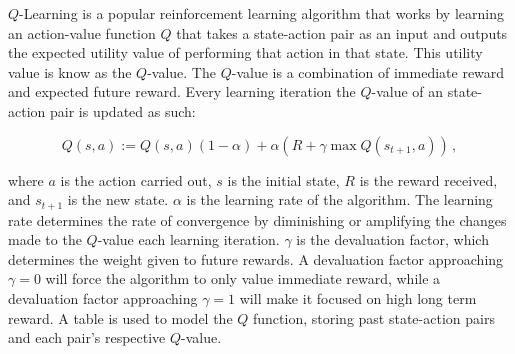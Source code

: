 $Q$-Learning \cite{watkins} is a popular reinforcement learning algorithm that works by learning an action-value function $Q$ that takes a state-action pair as an input and outputs the expected utility value of performing that action in that state.
This utility value is know as the $Q$-value.
The $Q$-value is a combination of immediate reward and expected future reward.
Every learning iteration the $Q$-value of an state-action pair is updated as such:

\begin{equation}
	Q(s, a) := Q(s, a)(1 - \alpha) + \alpha(R + \gamma \max Q(s_{t+1}, a))
	\,,
	\label{equ::updateqlearn}
\end{equation}

\noindent
where $a$ is the action carried out, $s$ is the initial state, $R$ is the reward received, and $s_{t+1}$ is the new state.
$\alpha$ is the learning rate of the algorithm.
The learning rate determines the rate of convergence by diminishing or amplifying the changes made to the $Q$-value each learning iteration.
$\gamma$ is the devaluation factor, which determines the weight given to future rewards.
A devaluation factor approaching $\gamma=0$ will force the algorithm to only value immediate reward, while a devaluation factor approaching $\gamma=1$ will make it focused on high long term reward.
A table is used to model the $Q$ function, storing past state-action pairs and each pair's respective $Q$-value.
